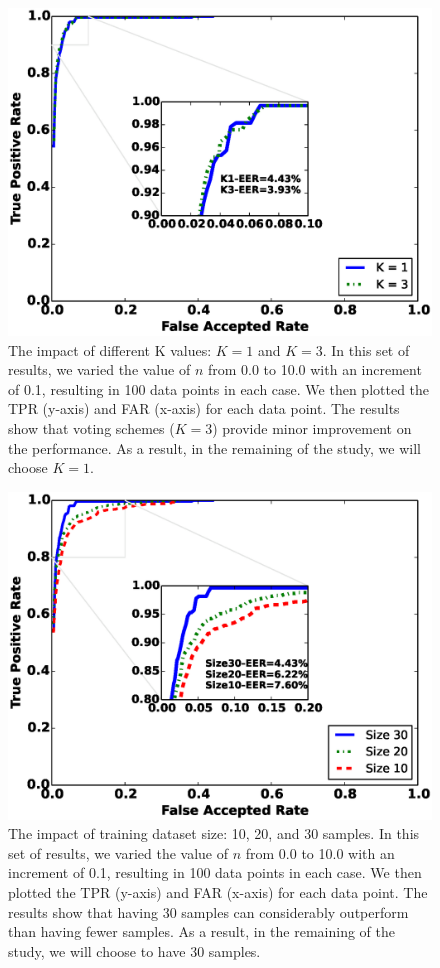 \begin{figure}\centering
\includegraphics[width=.75\columnwidth]{figure/roc_k_value.eps}
\caption{\label{fig:roc_k_value} The impact of different K values: $K=1$ and $K=3$. In this set of results, we varied the value of $n$ from 0.0 to 10.0 with an increment of 0.1, resulting in 100 data points in each case. We then plotted the TPR (y-axis) and FAR (x-axis) for each data point. The results show that voting schemes ($K=3$) provide minor improvement on the performance. As a result, in the remaining of the study, we will choose $K=1$.}
\end{figure}



\begin{figure}[t]
\centering
\includegraphics [width=.75\columnwidth]{figure/roc_diff_size.eps}
\caption{The impact of training dataset size: 10, 20, and 30 samples. In this set of results, we varied the value of $n$ from 0.0 to 10.0 with an increment of 0.1, resulting in 100 data points in each case. We then plotted the TPR (y-axis) and FAR (x-axis) for each data point. The results show that having 30 samples can considerably outperform than having fewer samples. As a result, in the remaining of the study, we will choose to have 30 samples.}
\label{fig:roc_diff_size}
\end{figure}

